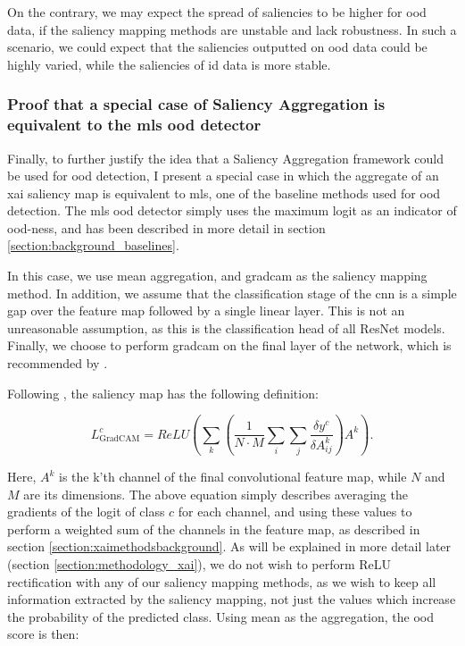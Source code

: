 \documentclass[UKenglish]{uiomasterthesis} %
\theoremstyle{definition}
\begin{document}
On the contrary, we may expect the spread of saliencies to be higher for \ac{ood} data, if the saliency mapping methods are unstable and lack robustness. In such a scenario, we could expect that the saliencies outputted on \ac{ood} data could be highly varied, while the saliencies of \ac{id} data is more stable.

\subsubsection{Proof that a special case of Saliency Aggregation is equivalent to the \acf{mls} \ac{ood} detector}

Finally, to further justify the idea that a Saliency Aggregation framework could be used for \ac{ood} detection, I present a special case in which the aggregate of an \ac{xai} saliency map is equivalent to \ac{mls}, one of the baseline methods used for \ac{ood} detection. The \ac{mls} \ac{ood} detector simply uses the maximum logit as an indicator of \ac{ood}-ness, and has been described in more detail in section \ref{section:background_baselines}.

In this case, we use mean aggregation, and \ac{gradcam} as the saliency mapping method. In addition, we assume that the classification stage of the \ac{cnn} is a simple \ac{gap} over the feature map followed by a single linear layer. This is not an unreasonable assumption, as this is the classification head of all ResNet models. Finally, we choose to perform \ac{gradcam} on the final layer of the network, which is recommended by \cite{gradcam}.

Following \cite{gradcam}, the saliency map has the following definition:

\begin{equation}
    L^c_{\text{GradCAM}} = ReLU\left(\sum_k \left( \frac{1}{N \cdot M} \sum_i \sum_j \frac{\delta y^c}{\delta A_{ij}^k} \right) A^k \right).
\end{equation}

Here, $A^k$ is the k'th channel of the final convolutional feature map, while $N$ and $M$ are its dimensions. The above equation simply describes averaging the gradients of the logit of class $c$ for each channel, and using these values to perform a weighted sum of the channels in the feature map, as described in section \ref{section:xaimethodsbackground}. As will be explained in more detail later (section \ref{section:methodology_xai}), we do not wish to perform ReLU rectification with any of our saliency mapping methods, as we wish to keep all information extracted by the saliency mapping, not just the values which increase the probability of the predicted class. Using mean as the aggregation, the \ac{ood} score is then:
\end{document}
